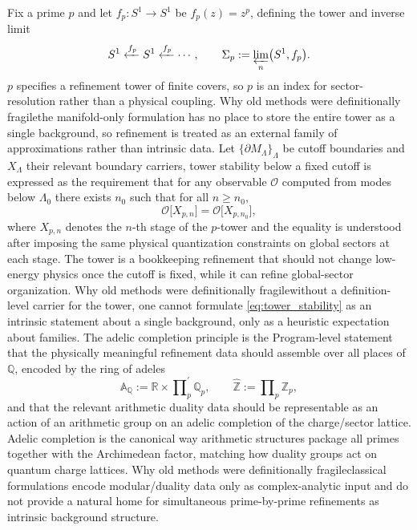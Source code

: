 \documentclass[11pt]{article}
\theoremstyle{remark}
\newcommand{\Z}{\mathbb{Z}}
\newcommand{\R}{\mathbb{R}}
\newcommand{\Q}{\mathbb{Q}}
\newcommand{\A}{\mathbb{A}}
\begin{document}
Fix a prime \(p\) and let \(f_p:S^{1}\to S^{1}\) be \(f_p(z)=z^{p}\), defining the tower and inverse limit
\begin{equation}\label{eq:p_tower}
S^{1}\xleftarrow{f_p}S^{1}\xleftarrow{f_p}\cdots,\qquad \Sigma_{p}:=\varprojlim_{n}\bigl(S^{1},f_p\bigr).
\end{equation}
\(p\) specifies a refinement tower of finite covers, so \(p\) is an index for sector-resolution rather than a physical coupling. Why old methods were definitionally fragile\:the manifold-only formulation has no place to store the entire tower as a single background, so refinement is treated as an external family of approximations rather than intrinsic data. Let \(\{\partial M_{\Lambda}\}_{\Lambda}\) be cutoff boundaries and \(X_{\Lambda}\) their relevant boundary carriers, tower stability below a fixed cutoff is expressed as the requirement that for any observable \(\mathcal{O}\) computed from modes below \(\Lambda_{0}\) there exists \(n_{0}\) such that for all \(n\ge n_{0}\),
\begin{equation}\label{eq:tower_stability}
\mathcal{O}\bigl[X_{p,n}\bigr]=\mathcal{O}\bigl[X_{p,n_{0}}\bigr],
\end{equation}
where \(X_{p,n}\) denotes the \(n\)-th stage of the \(p\)-tower and the equality is understood after imposing the same physical quantization constraints on global sectors at each stage. The tower is a bookkeeping refinement that should not change low-energy physics once the cutoff is fixed, while it can refine global-sector organization. Why old methods were definitionally fragile\:without a definition-level carrier for the tower, one cannot formulate \eqref{eq:tower_stability} as an intrinsic statement about a single background, only as a heuristic expectation about families. The adelic completion principle is the Program-level statement that the physically meaningful refinement data should assemble over all places of \(\Q\), encoded by the ring of adeles
\begin{equation}\label{eq:adeles}
\A_{\Q}:=\R\times \prod\nolimits_{p}^{\prime}\Q_{p},
\qquad
\widehat{\Z}:=\prod\nolimits_{p}\Z_{p},
\end{equation}
and that the relevant arithmetic duality data should be representable as an action of an arithmetic group on an adelic completion of the charge/sector lattice. Adelic completion is the canonical way arithmetic structures package all primes together with the Archimedean factor, matching how duality groups act on quantum charge lattices. Why old methods were definitionally fragile\:classical formulations encode modular/duality data only as complex-analytic input and do not provide a natural home for simultaneous prime-by-prime refinements as intrinsic background structure.
\end{document}
